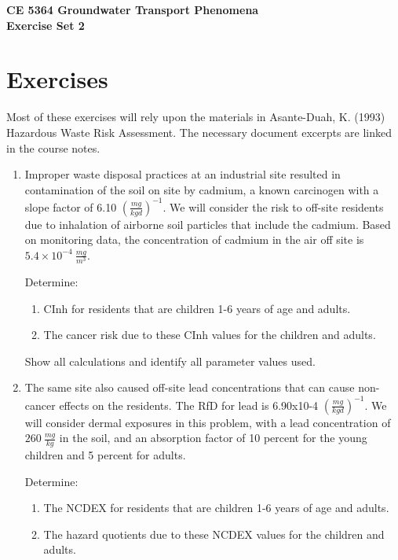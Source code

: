 \documentclass[12pt]{article}
\begin{document}
\begin{center}
{\textbf{{ CE 5364 Groundwater Transport Phenomena } \\ {Exercise Set 2}}}
\end{center}

\section*{\small{Exercises}}
Most of these exercises will rely upon the materials in Asante-Duah, K. (1993) Hazardous Waste Risk Assessment.  The necessary document excerpts are linked in the course notes.  
\begin{enumerate} %


\item Improper waste disposal practices at an industrial site resulted in contamination of the soil on site by cadmium, a known carcinogen with a slope factor of 6.10 $(\frac{mg}{kg d})^{-1}$. We will consider the risk to off-site residents due to inhalation of airborne soil particles that include the cadmium.  Based on monitoring data, the concentration of cadmium in the air off site is $5.4 \times 10^{-4}~\frac{mg}{m^3}$.

Determine:

\begin{enumerate} %
\item CInh for residents that are children 1-6 years of age and adults.
\item The cancer risk due to these CInh values for the children and adults. 
\end{enumerate} %

Show all calculations and identify all parameter values used.


\item The same site also caused off-site lead concentrations that can cause non-cancer effects on the residents. The RfD for lead is 6.90x10-4 $(\frac{mg}{kg d})^{-1}$.  We will consider dermal exposures in this problem, with a lead concentration of $260~\frac{mg}{kg}$ in the soil, and an absorption factor of 10 percent for the young children and 5 percent for adults. 

Determine:

\begin{enumerate} %
\item The NCDEX for residents that are children 1-6 years of age and adults. 
\item The hazard quotients due to these NCDEX values for the children and adults.
\end{enumerate} %


\end{enumerate}
\end{document}
